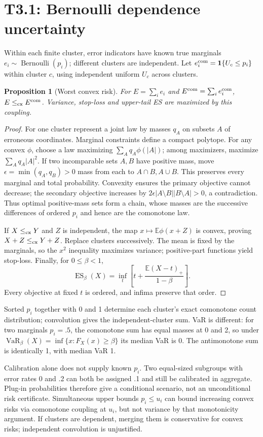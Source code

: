 \documentclass[11pt]{article}
\newtheorem{proposition}{Proposition}
\newcommand{\E}{\mathbb E}
\newcommand{\ind}{\mathbf 1}
\newcommand{\VaR}{\operatorname{VaR}}
\newcommand{\ES}{\operatorname{ES}}
\begin{document}
\section{T3.1: Bernoulli dependence uncertainty}
Within each finite cluster, error indicators have known true marginals
$e_i\sim\operatorname{Bernoulli}(p_i)$; different clusters are independent.
Let $e_i^{\rm com}=\ind\{U_c\le p_i\}$ within cluster $c$, using
independent uniform $U_c$ across clusters.
\begin{proposition}[Worst convex risk]
For $E=\sum_i e_i$ and $E^{\rm com}=\sum_i e_i^{\rm com}$,
$E\le_{\rm cx}E^{\rm com}$. Variance, stop-loss and upper-tail ES
are maximized by this coupling.
\end{proposition}
\begin{proof}
For one cluster represent a joint law by masses $q_A$ on subsets $A$
of erroneous coordinates. Marginal constraints define a compact
polytope. For any convex $\phi$, choose a law maximizing
$\sum_Aq_A\phi(|A|)$; among maximizers, maximize $\sum_Aq_A|A|^2$.
If two incomparable sets $A,B$ have positive mass, move
$\epsilon=\min(q_A,q_B)>0$ mass from each to $A\cap B,A\cup B$.
This preserves every marginal and total probability. Convexity ensures
the primary objective cannot decrease; the secondary objective increases
by $2\epsilon|A\setminus B||B\setminus A|>0$, a contradiction.
Thus optimal positive-mass sets form a chain, whose masses are the
successive differences of ordered $p_i$ and hence are the comonotone law.

If $X\le_{\rm cx}Y$ and $Z$ is independent, the map
$x\mapsto\E\phi(x+Z)$ is convex, proving $X+Z\le_{\rm cx}Y+Z$.
Replace clusters successively. The mean is fixed by the marginals, so
the $x^2$ inequality maximizes variance; positive-part functions yield
stop-loss. Finally, for $0\le\beta<1$,
\[
\ES_\beta(X)=\inf_t\left[t+\frac{\E(X-t)_+}{1-\beta}\right].
\]
Every objective at fixed $t$ is ordered, and infima preserve that order.
\end{proof}

Sorted $p_i$ together with 0 and 1 determine each cluster's exact
comonotone count distribution; convolution gives the independent-cluster
sum. VaR is different: for two marginals $p_i=.5$, the comonotone sum
has equal masses at 0 and 2, so under
$\VaR_\beta(X)=\inf\{x:F_X(x)\ge\beta\}$ its median VaR is 0.
The antimonotone sum is identically 1, with median VaR 1.

Calibration alone does not supply known $p_i$. Two equal-sized subgroups
with error rates 0 and .2 can both be assigned .1 and still be calibrated
in aggregate. Plug-in probabilities therefore give a conditional scenario,
not an unconditional risk certificate. Simultaneous upper bounds
$p_i\le u_i$ can bound increasing convex risks via comonotone coupling
at $u_i$, but not variance by that monotonicity argument. If clusters
are dependent, merging them is conservative for convex risks; independent
convolution is unjustified.
\end{document}

